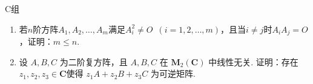 \centerline{\heiti C组}
\begin{enumerate}
    \item 若$n$阶方阵$A_1,A_2,\ldots,A_m$满足$A_i^2\neq O\enspace(i=1,2,\ldots,m)$，且当$i\neq j$时$A_iA_j=O$，证明：$m\leqslant n$.

    \item 设 $A,B,C$ 为二阶复方阵，且 $A,B,C$ 在 $\mathbf{M}_2(\mathbf{C})$ 中线性无关. 证明：存在$z_1,z_2,z_3 \in \mathbf{C}$使得 $z_1A+z_2B+z_3C$ 为可逆矩阵.
\end{enumerate}
